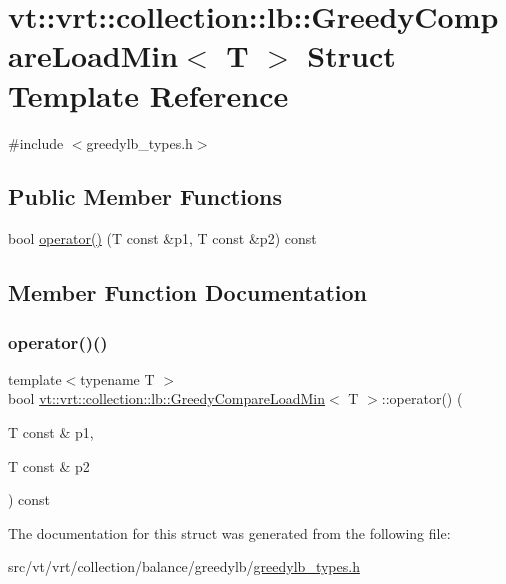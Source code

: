 \hypertarget{structvt_1_1vrt_1_1collection_1_1lb_1_1_greedy_compare_load_min}{}\section{vt\+:\+:vrt\+:\+:collection\+:\+:lb\+:\+:Greedy\+Compare\+Load\+Min$<$ T $>$ Struct Template Reference}
\label{structvt_1_1vrt_1_1collection_1_1lb_1_1_greedy_compare_load_min}


{\ttfamily \#include $<$greedylb\+\_\+types.\+h$>$}

\subsection*{Public Member Functions}
\begin{DoxyCompactItemize}
\item 
bool \hyperlink{structvt_1_1vrt_1_1collection_1_1lb_1_1_greedy_compare_load_min_aee8f7f9b40fcf20df2de45bdba28574f}{operator()} (T const \&p1, T const \&p2) const
\end{DoxyCompactItemize}


\subsection{Member Function Documentation}
\mbox{\label{structvt_1_1vrt_1_1collection_1_1lb_1_1_greedy_compare_load_min_aee8f7f9b40fcf20df2de45bdba28574f}} 
\subsubsection{\texorpdfstring{operator()()}{operator()()}}
{\footnotesize\ttfamily template$<$typename T $>$ \\
bool \hyperlink{structvt_1_1vrt_1_1collection_1_1lb_1_1_greedy_compare_load_min}{vt\+::vrt\+::collection\+::lb\+::\+Greedy\+Compare\+Load\+Min}$<$ T $>$\+::operator() (\begin{DoxyParamCaption}\item[{T const \&}]{p1,  }\item[{T const \&}]{p2 }\end{DoxyParamCaption}) const\hspace{0.3cm}{\ttfamily [inline]}}



The documentation for this struct was generated from the following file\+:\begin{DoxyCompactItemize}
\item 
src/vt/vrt/collection/balance/greedylb/\hyperlink{greedylb__types_8h}{greedylb\+\_\+types.\+h}\end{DoxyCompactItemize}
